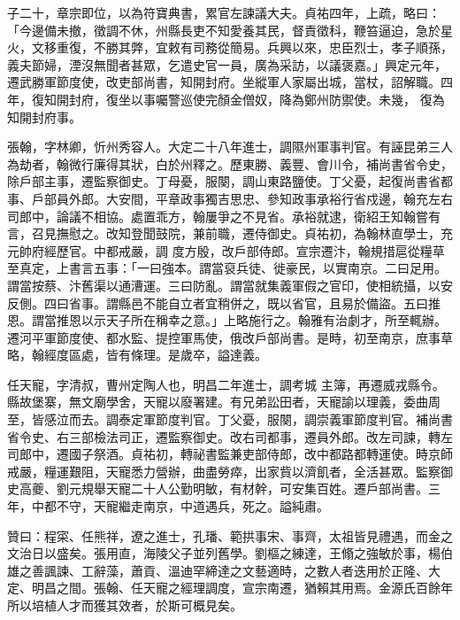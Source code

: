 \begin{pinyinscope}
 子二十，章宗即位，以為符寶典書，累官左諫議大夫。貞祐四年，上疏，略曰：「今邊備未撤，徵調不休，州縣長吏不知愛養其民，督責徵科，鞭笞逼迫，急於星火，文移重復，不勝其弊，宜敕有司務從簡易。兵興以來，忠臣烈士，孝子順孫，義夫節婦，湮沒無聞者甚眾，乞遣史官一員，廣為采訪，以議褒嘉。」興定元年，遷武勝軍節度使，改吏部尚書，知開封府。坐縱軍人家屬出城，當杖，詔解職。四年，復知開封府，復坐以事囑警巡使完顏金僧奴，降為鄭州防禦使。未幾，
 復為知開封府事。



 張翰，字林卿，忻州秀容人。大定二十八年進士，調隰州軍事判官。有誣昆弟三人為劫者，翰微行廉得其狀，白於州釋之。歷東勝、義豐、會川令，補尚書省令史，除戶部主事，遷監察御史。丁母憂，服闋，調山東路鹽使。丁父憂，起復尚書省都事、戶部員外郎。大安間，平章政事獨吉思忠、參知政事承裕行省戍邊，翰充左右司郎中，論議不相協。處置乖方，翰屢爭之不見省。承裕就逮，衛紹王知翰嘗有言，召見撫慰之。改知登聞鼓院，兼前職，遷侍御史。貞祐初，為翰林直學士，充元帥府經歷官。中都戒嚴，調
 度方殷，改戶部侍郎。宣宗遷汴，翰規措扈從糧草至真定，上書言五事：「一曰強本。謂當裒兵徒、徙豪民，以實南京。二曰足用。謂當按蔡、汴舊渠以通漕運。三曰防亂。謂當就集義軍假之官印，使相統攝，以安反側。四曰省事。謂縣邑不能自立者宜稍併之，既以省官，且易於備盜。五曰推恩。謂當推恩以示天子所在稱幸之意。」上略施行之。翰雅有治劇才，所至輒辦。遷河平軍節度使、都水監、提控軍馬使，俄改戶部尚書。是時，初至南京，庶事草略，翰經度區處，皆有條理。是歲卒，謚達義。



 任天寵，字清叔，曹州定陶人也，明昌二年進士，調考城
 主簿，再遷威戎縣令。縣故堡寨，無文廟學舍，天寵以廢署建。有兄弟訟田者，天寵諭以理義，委曲周至，皆感泣而去。調泰定軍節度判官。丁父憂，服闋，調崇義軍節度判官。補尚書省令史、右三部檢法司正，遷監察御史。改右司都事，遷員外郎。改左司諫，轉左司郎中，遷國子祭酒。貞祐初，轉祕書監兼吏部侍郎，改中都路都轉運使。時京師戒嚴，糧運艱阻，天寵悉力營辦，曲盡勞瘁，出家貲以濟飢者，全活甚眾。監察御史高夔、劉元規舉天寵二十人公勤明敏，有材幹，可安集百姓。遷戶部尚書。三年，中都不守，天寵繼走南京，中道遇兵，死之。謚純肅。



 贊曰：程寀、任熊祥，遼之進士，孔璠、範拱事宋、事齊，太祖皆見禮遇，而金之文治日以盛矣。張用直，海陵父子並列舊學。劉樞之練達，王翛之強敏於事，楊伯雄之善諷諫、工辭藻，蕭貢、溫迪罕締達之文藝適時，之數人者迭用於正隆、大定、明昌之間。張翰、任天寵之經理調度，宣宗南遷，猶賴其用焉。金源氏百餘年所以培植人才而獲其效者，於斯可概見矣。



\end{pinyinscope}